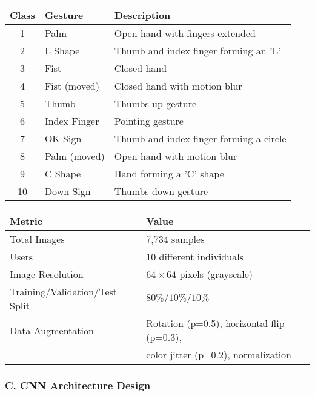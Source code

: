 \documentclass[11pt,a4paper,twoside]{article}
\begin{document}
\begin{infobox}
\centering
\small
\begin{tabularx}{0.98\textwidth}{|c|l|X|}
\hline
\rowcolor{tableheader}
\textbf{Class} & \textbf{Gesture} & \textbf{Description} \\
\hline
1 & Palm & Open hand with fingers extended \\
\hline
2 & L Shape & Thumb and index finger forming an 'L' \\
\hline
3 & Fist & Closed hand \\
\hline
4 & Fist (moved) & Closed hand with motion blur \\
\hline
5 & Thumb & Thumbs up gesture \\
\hline
6 & Index Finger & Pointing gesture \\
\hline
7 & OK Sign & Thumb and index finger forming a circle \\
\hline
8 & Palm (moved) & Open hand with motion blur \\
\hline
9 & C Shape & Hand forming a 'C' shape \\
\hline
10 & Down Sign & Thumbs down gesture \\
\hline
\end{tabularx}
\end{infobox}

\begin{warningbox}
\centering
\small
\begin{tabularx}{0.7\textwidth}{|l|X|}
\hline
\textbf{Metric} & \textbf{Value} \\
\hline
Total Images & 7,734 samples \\
\hline
Users & 10 different individuals \\
\hline
Image Resolution & $64\times 64$ pixels (grayscale) \\
\hline
Training/Validation/Test Split & $80\%/10\%/10\%$ \\
\hline
Data Augmentation & Rotation (p=0.5), horizontal flip (p=0.3), \\ & color jitter (p=0.2), normalization \\
\hline
\end{tabularx}
\end{warningbox}

\subsubsection{C. CNN Architecture
Design}\label{c.-cnn-architecture-design}
\end{document}
